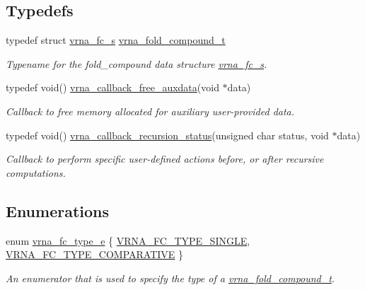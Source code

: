 \subsection*{Typedefs}
\begin{DoxyCompactItemize}
\item 
\mbox{\label{group__fold__compound_ga1b0cef17fd40466cef5968eaeeff6166}} 
typedef struct \mbox{\hyperlink{group__fold__compound_structvrna__fc__s}{vrna\+\_\+fc\+\_\+s}} \mbox{\hyperlink{group__fold__compound_ga1b0cef17fd40466cef5968eaeeff6166}{vrna\+\_\+fold\+\_\+compound\+\_\+t}}
\begin{DoxyCompactList}\small\item\em Typename for the fold\+\_\+compound data structure \mbox{\hyperlink{group__fold__compound_structvrna__fc__s}{vrna\+\_\+fc\+\_\+s}}. \end{DoxyCompactList}\item 
typedef void() \mbox{\hyperlink{group__fold__compound_ga7806651f51b195013839a218b3bbd5a3}{vrna\+\_\+callback\+\_\+free\+\_\+auxdata}}(void $\ast$data)
\begin{DoxyCompactList}\small\item\em Callback to free memory allocated for auxiliary user-\/provided data. \end{DoxyCompactList}\item 
typedef void() \mbox{\hyperlink{group__fold__compound_gac86036fa8cad1108832335063243cdc8}{vrna\+\_\+callback\+\_\+recursion\+\_\+status}}(unsigned char status, void $\ast$data)
\begin{DoxyCompactList}\small\item\em Callback to perform specific user-\/defined actions before, or after recursive computations. \end{DoxyCompactList}\end{DoxyCompactItemize}
\subsection*{Enumerations}
\begin{DoxyCompactItemize}
\item 
enum \mbox{\hyperlink{group__fold__compound_ga01a4ff86fa71deaaa5d1abbd95a1447d}{vrna\+\_\+fc\+\_\+type\+\_\+e}} \{ \mbox{\hyperlink{group__fold__compound_gga01a4ff86fa71deaaa5d1abbd95a1447da7e264dd3cf2dc9b6448caabcb7763cd6}{V\+R\+N\+A\+\_\+\+F\+C\+\_\+\+T\+Y\+P\+E\+\_\+\+S\+I\+N\+G\+LE}}, 
\mbox{\hyperlink{group__fold__compound_gga01a4ff86fa71deaaa5d1abbd95a1447dab821ce46ea3cf665be97df22a76f5023}{V\+R\+N\+A\+\_\+\+F\+C\+\_\+\+T\+Y\+P\+E\+\_\+\+C\+O\+M\+P\+A\+R\+A\+T\+I\+VE}}
 \}
\begin{DoxyCompactList}\small\item\em An enumerator that is used to specify the type of a \mbox{\hyperlink{group__fold__compound_ga1b0cef17fd40466cef5968eaeeff6166}{vrna\+\_\+fold\+\_\+compound\+\_\+t}}. \end{DoxyCompactList}\end{DoxyCompactItemize}
